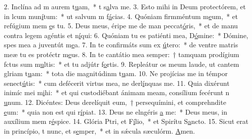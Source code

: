 2. Inclína ad m aurem t\uline{u}am,~* t s\uline{a}lva me.
3. Esto mihi in Deum protectórem, et in lcum mun\uline{í}tum:~* ut salvum m f\uline{á}cias.
4. Quóniam firmméntum m\uline{e}um,~* et refúgium mem \uline{e}s tu.
5. Deus meus, éripe me de man peccat\uline{ó}ris,~* et de manu contra legem agéntis et n\uline{í}qui:
6. Quóniam tu es patiénti mea, D\uline{ó}mine:~* Dómine, spes mea a juventút m\uline{e}a.
7. In te confirmáts sum ex \uline{ú}tero:~* de ventre matris meæ tu es protéctr m\uline{e}us.
8. In te cantátio mea semper:~† tamquam prodígium fctus sum m\uline{u}ltis:~* et tu adjútr f\uline{o}rtis.
9. Repleátur os meum laude, ut cantem glriam t\uline{u}am:~* tota die magnitúdinm t\uline{u}am.
10. Ne projícias me in témpor senect\uline{ú}tis:~* cum defécerit virtus mea, ne derl\uline{í}nquas me.
11. Quia dixérunt inimíc mei m\uline{i}hi:~* et qui custodiébant ánimam meam, consílium fecérunt n \uline{u}num.
12. Dicéntes: Deus derelíquit eum,~† persequímini, et comprehndite \uline{e}um:~* quia non est qui r\uline{í}piat.
13. Deus ne elngéris \uline{a} me:~* Deus meus, in auxílium mem r\uline{é}spice.
14. Glória Ptri, et F\uline{í}lio,~* et Spirítu S\uline{a}ncto.
15. Sicut erat in princípio, t nunc, et s\uline{e}mper,~* et in sǽcula sæculórm. \uline{A}men.
